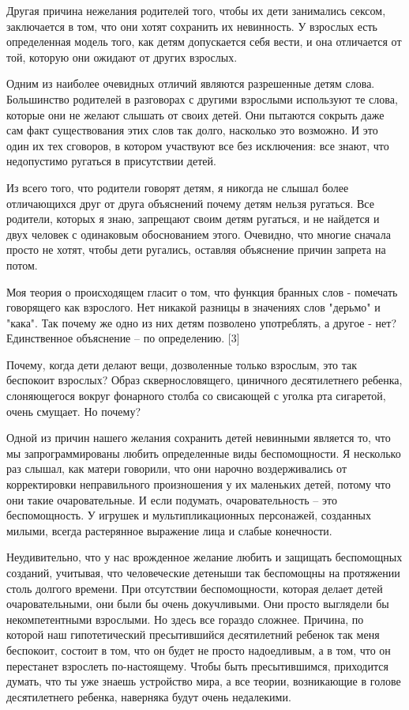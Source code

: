 \documentclass[ebook,12pt,oneside,openany]{memoir}
\begin{document}
Другая причина нежелания родителей того, чтобы их дети занимались
сексом, заключается в том, что они хотят сохранить их невинность. У
взрослых есть определенная модель того, как детям допускается себя
вести, и она отличается от той, которую они ожидают от других
взрослых.

Одним из наиболее очевидных отличий являются разрешенные детям слова.
Большинство родителей в разговорах с другими взрослыми используют те
слова, которые они не желают слышать от своих детей. Они пытаются
сокрыть даже сам факт существования этих слов так долго, насколько это
возможно. И это один их тех сговоров, в котором участвуют все без
исключения: все знают, что недопустимо ругаться в присутствии детей.

Из всего того, что родители говорят детям, я никогда не слышал более
отличающихся друг от друга объяснений почему детям нельзя ругаться.
Все родители, которых я знаю, запрещают своим детям ругаться, и не
найдется и двух человек с одинаковым обоснованием этого. Очевидно, что
многие сначала просто не хотят, чтобы дети ругались, оставляя
объяснение причин запрета на потом.

Моя теория о происходящем гласит о том, что функция бранных слов -
помечать говорящего как взрослого. Нет никакой разницы в значениях
слов "дерьмо" и "кака". Так почему же одно из них детям позволено
употреблять, а другое - нет? Единственное объяснение -- по
определению. [3]

Почему, когда дети делают вещи, дозволенные только взрослым, это так
беспокоит взрослых? Образ сквернословящего, циничного десятилетнего
ребенка, слоняющегося вокруг фонарного столба со свисающей с уголка
рта сигаретой, очень смущает. Но почему?

Одной из причин нашего желания сохранить детей невинными является то,
что мы запрограммированы любить определенные виды беспомощности. Я
несколько раз слышал, как матери говорили, что они нарочно
воздерживались от корректировки неправильного произношения у их
маленьких детей, потому что они такие очаровательные. И если подумать,
очаровательность -- это беспомощность. У игрушек и мультипликационных
персонажей, созданных милыми, всегда растерянное выражение лица и
слабые конечности.

Неудивительно, что у нас врожденное желание любить и защищать
беспомощных созданий, учитывая, что человеческие детеныши так
беспомощны на протяжении столь долгого времени. При отсутствии
беспомощности, которая делает детей очаровательными, они были бы очень
докучливыми. Они просто выглядели бы некомпетентными взрослыми. Но
здесь все гораздо сложнее. Причина, по которой наш гипотетический
пресытившийся десятилетний ребенок так меня беспокоит, состоит в том,
что он будет не просто надоедливым, а в том, что он перестанет
взрослеть по-настоящему. Чтобы быть пресытившимся, приходится думать,
что ты уже знаешь устройство мира, а все теории, возникающие в голове
десятилетнего ребенка, наверняка будут очень недалекими.
\end{document}
